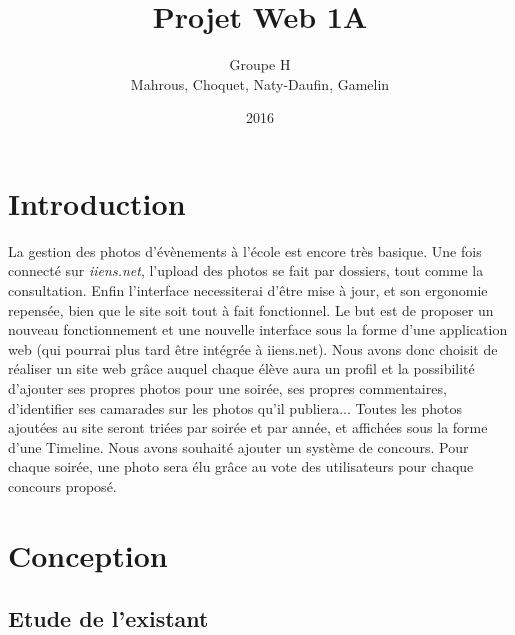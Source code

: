 \documentclass[11pt]{article} %
\title{Projet Web 1A}
\author{Groupe H \\Mahrous, Choquet, Naty-Daufin, Gamelin}
\date{2016} %
\begin{document}
\maketitle

\tableofcontents %

\newpage


\section{Introduction}

La gestion des photos d’évènements à l’école est encore très basique. Une fois connecté sur \emph{iiens.net}, l'upload des photos se fait par dossiers, tout comme la consultation. Enfin l'interface necessiterai d'être mise à jour, et son ergonomie repensée, bien que le site soit tout à fait fonctionnel.
Le but est de proposer un nouveau fonctionnement et une nouvelle interface sous la forme d’une application web (qui pourrai plus tard être intégrée à iiens.net).
Nous avons donc choisit de réaliser un site web grâce auquel chaque élève aura un profil et la possibilité d’ajouter ses propres photos pour une soirée, ses propres commentaires, d’identifier ses camarades sur les photos qu’il publiera... Toutes les photos ajoutées au site seront triées par soirée et par année, et affichées sous la forme d’une Timeline.
Nous avons souhaité ajouter un système de concours. Pour chaque soirée, une photo sera élu grâce au vote des utilisateurs pour chaque concours proposé. 


\section{Conception}

\subsection{Etude de l'existant}
\end{document}
